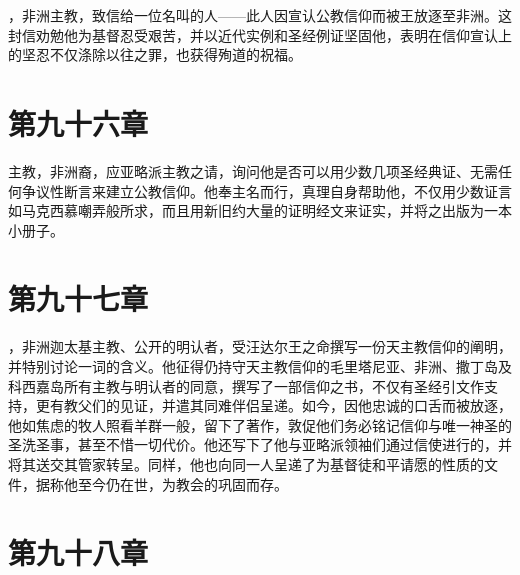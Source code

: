 ，非洲主教，致信给一位名叫的人——此人因宣认公教信仰而被王放逐至非洲。这封信劝勉他为基督忍受艰苦，并以近代实例和圣经例证坚固他，表明在信仰宣认上的坚忍不仅涤除以往之罪，也获得殉道的祝福。\par


\section{第九十六章}

主教，非洲裔，应亚略派主教之请，询问他是否可以用少数几项圣经典证、无需任何争议性断言来建立公教信仰。他奉主名而行，真理自身帮助他，不仅用少数证言如马克西慕嘲弄般所求，而且用新旧约大量的证明经文来证实，并将之出版为一本小册子。\par


\section{第九十七章}

，非洲迦太基主教、公开的明认者，受汪达尔王之命撰写一份天主教信仰的阐明，并特别讨论一词的含义。他征得仍持守天主教信仰的毛里塔尼亚、非洲、撒丁岛及科西嘉岛所有主教与明认者的同意，撰写了一部信仰之书，不仅有圣经引文作支持，更有教父们的见证，并遣其同难伴侣呈递。如今，因他忠诚的口舌而被放逐，他如焦虑的牧人照看羊群一般，留下了著作，敦促他们务必铭记信仰与唯一神圣的圣洗圣事，甚至不惜一切代价。他还写下了他与亚略派领袖们通过信使进行的，并将其送交其管家转呈。同样，他也向同一人呈递了为基督徒和平请愿的性质的文件，据称他至今仍在世，为教会的巩固而存。\par


\section{第九十八章}

